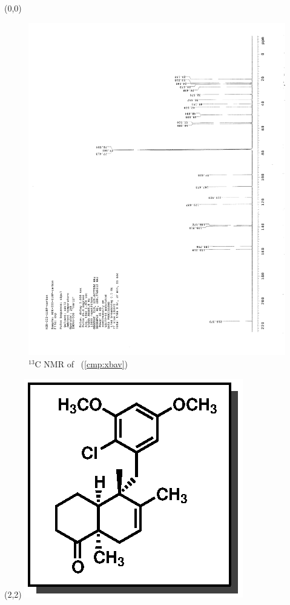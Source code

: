 \clearpage
\begin{textblock}{20}(0,0)
\begin{figure}[htb]
\caption{$^{13}$C NMR of  \CMPxbav\ (\ref{cmp:xbav})}
\includegraphics[scale=0.75, trim = 0mm 0mm 0mm 5mm,
clip]{chp_singlecarbon/images/nmr/xbavC}
\vspace{-100pt}
\end{figure}
\end{textblock}
\begin{textblock}{1}(2,2)
\includegraphics[scale=0.8, angle=90]{chp_singlecarbon/images/xbav}
\end{textblock}
\clearpage

